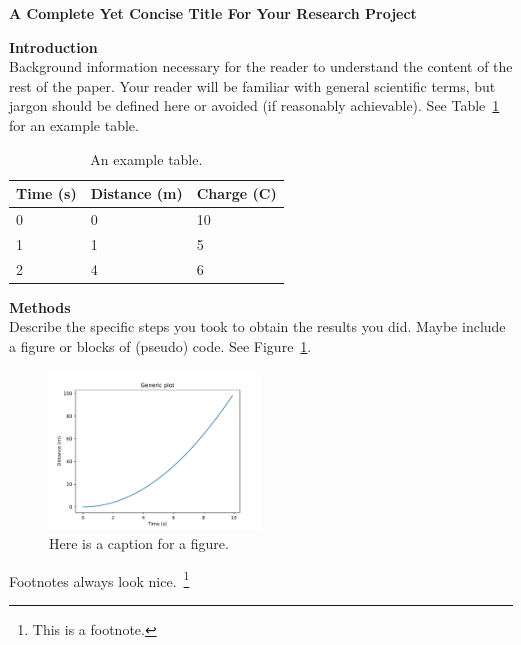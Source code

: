 \documentclass[12pt, letterpaper, twocolumn]{article}
\begin{document}
\begin{center}
\textbf{A Complete Yet Concise Title For Your Research Project}
\end{center}

\noindent\textbf{Introduction}\\
Background information necessary for the reader to understand the content of the rest of the paper. Your reader will be familiar with general scientific terms, but jargon should be defined here or avoided (if reasonably achievable). See Table~\ref{table:ExampleTable} for an example table.

\begin{table}[ht]
\begin{tabular}{|l|l|l|}
\hline
Time (s) & Distance (m) & Charge (C) \\ \hline
0        & 0            & 10         \\ \hline
1        & 1            & 5          \\ \hline
2        & 4            & 6          \\ \hline
\end{tabular}
\caption{An example table.}
\label{table:ExampleTable}
\end{table}

\vspace{0.125in}
\noindent\textbf{Methods}\\
Describe the specific steps you took to obtain the results you did. Maybe include a figure or blocks of (pseudo) code. See Figure~\ref{fig:ExampleFigure}.
\begin{figure}[ht]
    \centering
    \includegraphics[width=0.5\textwidth]{img/generic_plot.pdf}
    \caption{Here is a caption for a figure.}
    \label{fig:ExampleFigure}
\end{figure}
Footnotes always look nice.~\footnote{This is a footnote.}
\end{document}
